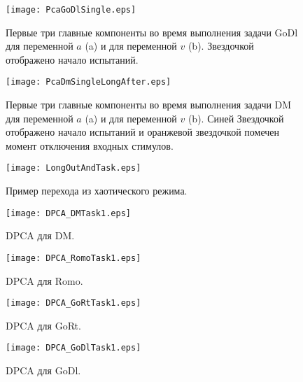 \documentclass{article}
\begin{document}
\begin{figure}[h!] \label{fig:PcaGoDlSingle}
  \begin{center}
    \texttt{[image: PcaGoDlSingle.eps]}
    \caption{Первые три главные компоненты во время выполнения задачи GoDl для переменной $a$ (a) и для переменной $v$ (b). Звездочкой отображено начало испытаний.}
  \end{center}
\end{figure}

\begin{figure}[h!] \label{fig:PcaDmSingleLongAfter}
  \begin{center}
    \texttt{[image: PcaDmSingleLongAfter.eps]}
    \caption{Первые три главные компоненты во время выполнения задачи DM для переменной $a$ (a) и для переменной $v$ (b). Синей Звездочкой отображено начало испытаний и оранжевой звездочкой помечен момент отключения входных стимулов.}
  \end{center}
\end{figure}


\begin{figure}[h!] \label{fig:LongOutAndTask}
  \begin{center}
    \texttt{[image: LongOutAndTask.eps]}
    \caption{Пример перехода из хаотического режима.}
  \end{center}
\end{figure}


\begin{figure}[h!] \label{fig:DPCADMTask}
  \begin{center}
    \texttt{[image: DPCA\_DMTask1.eps]}
    \caption{DPCA для DM.}
  \end{center}
\end{figure}

\begin{figure}[h!] \label{fig:DPCARomoTask}
  \begin{center}
    \texttt{[image: DPCA\_RomoTask1.eps]}
    \caption{DPCA для Romo.}
  \end{center}
\end{figure}

\begin{figure}[h!] \label{fig:DPCAGoRtTask}
  \begin{center}
    \texttt{[image: DPCA\_GoRtTask1.eps]}
    \caption{DPCA для GoRt.}
  \end{center}
\end{figure}

\begin{figure}[h!] \label{fig:DPCAGoDlTask}
  \begin{center}
    \texttt{[image: DPCA\_GoDlTask1.eps]}
    \caption{DPCA для GoDl.}
  \end{center}
\end{figure}

\newpage
\end{document}
